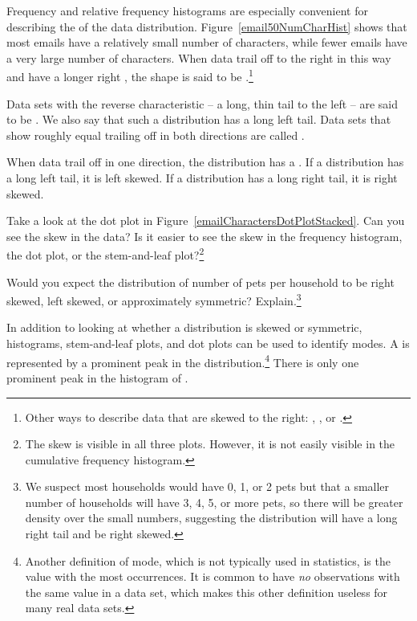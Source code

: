 Frequency and relative frequency histograms are especially convenient for describing the  of the data distribution\label{shapeFirstDiscussed}. Figure~\ref{email50NumCharHist} shows that most emails have a relatively small number of characters, while fewer emails have a very large number of characters. When data trail off to the right in this way and have a longer right , the shape is said to be .\footnote{Other ways to describe data that are skewed to the right: , , or .}

Data sets with the reverse characteristic -- a long, thin tail to the left -- are said to be . We also say that such a distribution has a long left tail. Data sets that show roughly equal trailing off in both directions are called .

\begin{termBox}{%
When data trail off in one direction, the distribution has a .  If a distribution has a long left tail, it is left skewed. If a distribution has a long right tail, it is right skewed.}
\end{termBox}

\begin{exercise}
Take a look at the dot plot in Figure~\ref{emailCharactersDotPlotStacked}. Can you see the skew in the data? Is it easier to see the skew in the frequency histogram, the dot plot, or the stem-and-leaf plot?\footnote{The skew is visible in all three plots. However, it is not easily visible in the cumulative frequency histogram.}
\end{exercise}

\begin{exercise}
Would you expect the distribution of number of pets per household to be right skewed, left skewed, or approximately symmetric?  Explain.\footnote{We suspect most households would have 0, 1, or 2 pets but that a smaller number of households will have 3, 4, 5, or more pets, so there will be greater density over the small numbers, suggesting the distribution will have a long right tail and be right skewed.}
\end{exercise}

In addition to looking at whether a distribution is skewed or symmetric, histograms, stem-and-leaf plots, and dot plots can be used to identify modes. A  is represented by a prominent peak in the distribution.\footnote{Another definition of mode, which is not typically used in statistics, is the value with the most occurrences. It is common to have \emph{no} observations with the same value in a data set, which makes this other definition useless for many real data sets.} There is only one prominent peak in the histogram of .

